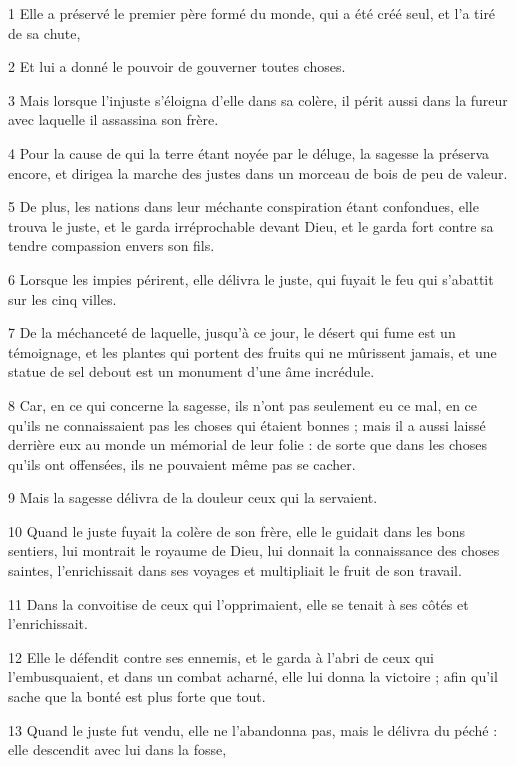 
\par 1 Elle a préservé le premier père formé du monde, qui a été créé seul, et l'a tiré de sa chute,
\par 2 Et lui a donné le pouvoir de gouverner toutes choses.
\par 3 Mais lorsque l'injuste s'éloigna d'elle dans sa colère, il périt aussi dans la fureur avec laquelle il assassina son frère.
\par 4 Pour la cause de qui la terre étant noyée par le déluge, la sagesse la préserva encore, et dirigea la marche des justes dans un morceau de bois de peu de valeur.
\par 5 De plus, les nations dans leur méchante conspiration étant confondues, elle trouva le juste, et le garda irréprochable devant Dieu, et le garda fort contre sa tendre compassion envers son fils.
\par 6 Lorsque les impies périrent, elle délivra le juste, qui fuyait le feu qui s'abattit sur les cinq villes.
\par 7 De la méchanceté de laquelle, jusqu'à ce jour, le désert qui fume est un témoignage, et les plantes qui portent des fruits qui ne mûrissent jamais, et une statue de sel debout est un monument d'une âme incrédule.
\par 8 Car, en ce qui concerne la sagesse, ils n'ont pas seulement eu ce mal, en ce qu'ils ne connaissaient pas les choses qui étaient bonnes ; mais il a aussi laissé derrière eux au monde un mémorial de leur folie : de sorte que dans les choses qu'ils ont offensées, ils ne pouvaient même pas se cacher.
\par 9 Mais la sagesse délivra de la douleur ceux qui la servaient.
\par 10 Quand le juste fuyait la colère de son frère, elle le guidait dans les bons sentiers, lui montrait le royaume de Dieu, lui donnait la connaissance des choses saintes, l'enrichissait dans ses voyages et multipliait le fruit de son travail.
\par 11 Dans la convoitise de ceux qui l'opprimaient, elle se tenait à ses côtés et l'enrichissait.
\par 12 Elle le défendit contre ses ennemis, et le garda à l'abri de ceux qui l'embusquaient, et dans un combat acharné, elle lui donna la victoire ; afin qu'il sache que la bonté est plus forte que tout.
\par 13 Quand le juste fut vendu, elle ne l'abandonna pas, mais le délivra du péché : elle descendit avec lui dans la fosse,
